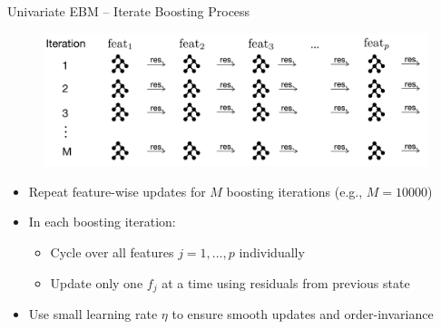 \documentclass[10pt,compress,t,notes=noshow, xcolor=table]{beamer}
\begin{document}
\begin{frame}{Univariate EBM – Iterate Boosting Process}
\begin{figure}
    \centering
    \includegraphics[width=\linewidth]{figure/EBM_Step3.png}
\end{figure}
\begin{itemize}
    \item Repeat feature-wise updates for $M$ boosting iterations (e.g., $M=10000$)
    \item In each boosting iteration:
    \begin{itemize}
        \item Cycle over all features $j=1,\dots,p$ individually %
        \item Update only one $f_j$ at a time using residuals from previous state
    \end{itemize}
    \item Use small learning rate $\eta$ to ensure smooth updates and order-invariance
\end{itemize}
\end{frame}














\end{document}
